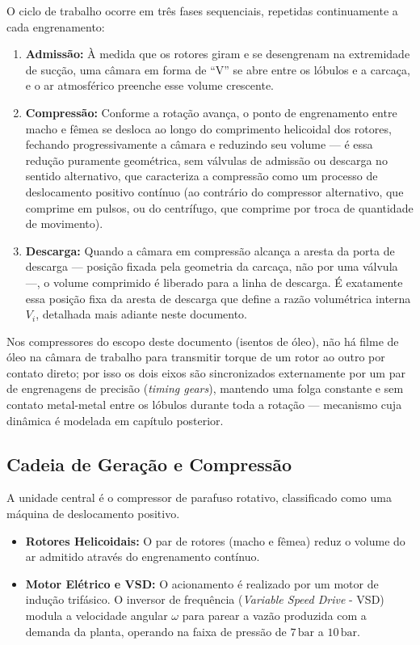 \documentclass[12pt,a4paper]{article}
\numberwithin{equation}{section}
\numberwithin{table}{section}
\numberwithin{figure}{section}
\begin{document}
{	O ciclo de trabalho ocorre em três fases sequenciais, repetidas continuamente a cada engrenamento:
	\begin{enumerate}
		\item \textbf{Admissão:} À medida que os rotores giram e se desengrenam na extremidade de sucção, uma câmara em forma de ``V'' se abre entre os lóbulos e a carcaça, e o ar atmosférico preenche esse volume crescente.
		\item \textbf{Compressão:} Conforme a rotação avança, o ponto de engrenamento entre macho e fêmea se desloca ao longo do comprimento helicoidal dos rotores, fechando progressivamente a câmara e reduzindo seu volume — é essa redução puramente geométrica, sem válvulas de admissão ou descarga no sentido alternativo, que caracteriza a compressão como um processo de deslocamento positivo contínuo (ao contrário do compressor alternativo, que comprime em pulsos, ou do centrífugo, que comprime por troca de quantidade de movimento).
		\item \textbf{Descarga:} Quando a câmara em compressão alcança a aresta da porta de descarga — posição fixada pela geometria da carcaça, não por uma válvula —, o volume comprimido é liberado para a linha de descarga. É exatamente essa posição fixa da aresta de descarga que define a razão volumétrica interna $V_i$, detalhada mais adiante neste documento.
	\end{enumerate}
	Nos compressores do escopo deste documento (isentos de óleo), não há filme de óleo na câmara de trabalho para transmitir torque de um rotor ao outro por contato direto; por isso os dois eixos são sincronizados externamente por um par de engrenagens de precisão (\textit{timing gears}), mantendo uma folga constante e sem contato metal-metal entre os lóbulos durante toda a rotação — mecanismo cuja dinâmica é modelada em capítulo posterior.

	\subsection{\textbf{Cadeia de Geração e Compressão}}
	A unidade central é o compressor de parafuso rotativo, classificado como uma máquina de deslocamento positivo.
	\begin{itemize}
		\item \textbf{Rotores Helicoidais:} O par de rotores (macho e fêmea) reduz o volume do ar admitido através do engrenamento contínuo.
		\item \textbf{Motor Elétrico e VSD:} O acionamento é realizado por um motor de indução trifásico. O inversor de frequência (\textit{Variable Speed Drive} - VSD) modula a velocidade angular $\omega$ para parear a vazão produzida com a demanda da planta, operando na faixa de pressão de $7\,\text{bar}$ a $10\,\text{bar}$.
	\end{itemize}

}
\end{document}
